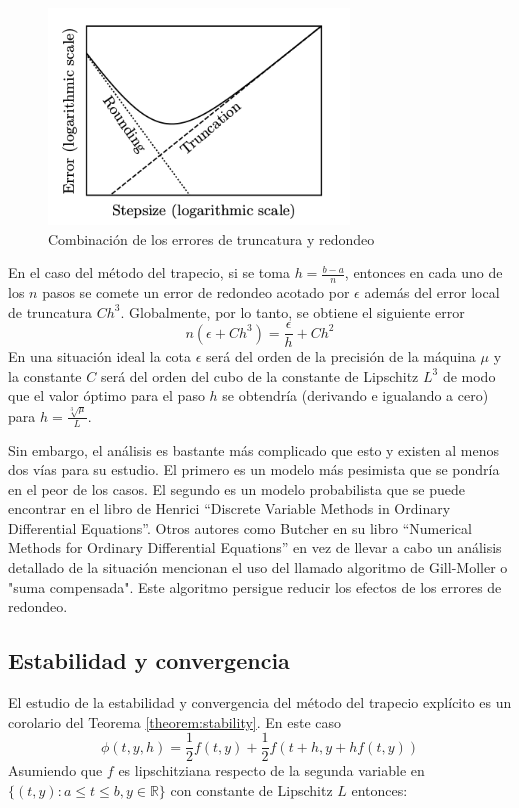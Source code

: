 \documentclass{article}
\theoremstyle{theorem-style}  %
\theoremstyle{definition-style}
\theoremstyle{example-style}
\begin{document}
		\begin{figure}[H]
			\centering
			\includegraphics[width=8cm]{./Images/redondeo.png}
			\caption{Combinación de los errores de truncatura y redondeo}
			\label{fig:redondeo}
		\end{figure}

		En el caso del método del trapecio, si se toma $h=\frac{b-a}{n}$, entonces en cada uno de los $n$ pasos se comete un error de redondeo acotado por $\epsilon$ además del error local de truncatura $Ch^{3}$. Globalmente, por lo tanto, se obtiene el siguiente error
		$$ n(\epsilon+Ch^{3})=\frac{\epsilon}{h}+Ch^{2} $$
		En una situación ideal la cota $\epsilon$ será del orden de la precisión de la máquina $\mu$ y la constante $C$ será del orden del cubo de la constante de Lipschitz $L^3$ de modo que el valor óptimo para el paso $h$ se obtendría (derivando e igualando a cero) para $h=\frac{\sqrt[3]\mu}{L}$.

		Sin embargo, el análisis es bastante más complicado que esto y existen al menos dos vías para su estudio. El primero es un modelo más pesimista que se pondría en el peor de los casos. El segundo es un modelo probabilista que se puede encontrar en el libro de Henrici ``Discrete Variable Methods in Ordinary Differential Equations''. Otros autores como Butcher en su libro ``Numerical Methods for Ordinary Differential Equations'' en vez de llevar a cabo un análisis detallado de la situación mencionan el uso del llamado algoritmo de Gill-Moller o "suma compensada". Este algoritmo persigue reducir los efectos de los errores de redondeo.\cite{Butcher}

	\subsection{Estabilidad y convergencia} \label{sec:trapecio-explicito:estabilidad}
	
		El estudio de la estabilidad y convergencia del método del trapecio explícito es un corolario del Teorema \ref{theorem:stability}. En este caso
		$$\phi(t,y,h)=\frac{1}{2}f(t,y)+\frac{1}{2}f(t+h,y+hf(t,y))$$
		Asumiendo que $f$ es lipschitziana respecto de la segunda variable en  $\{(t,y):a \leq t \leq b, y \in \mathbb{R}\}$ con constante de Lipschitz $L$ entonces:
	
\end{document}
